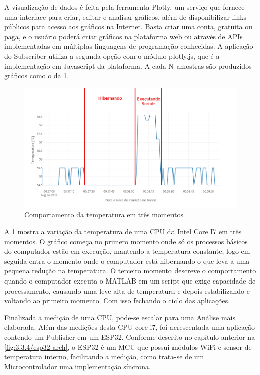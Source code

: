 A visualização de dados é feita pela ferramenta Plotly, um serviço que fornece uma interface para criar, editar e analisar gráficos, além de disponibilizar links públicos para acesso aos gráficos na Internet. Basta criar uma conta, gratuita ou paga, e o usuário poderá criar gráficos na plataforma web ou através de APIs implementadas em múltiplas linguagens de programação conhecidas. A aplicação do Subscriber utiliza a segunda opção com o módulo plotly.js, que é a implementação em Javascript da plataforma. A cada N amostras são produzidos gráficos como o da  \ref{fig:4.1.0/cpu-temp_1}.


\begin{figure}[h!]
\centering
\includegraphics[width=16cm]{./02_Capitulos/02_Cap4/figures/cpu-temp_1}
\caption{Comportamento da temperatura em três momentos}
\label{fig:4.1.0/cpu-temp_1}
\end{figure}

A \ref{fig:4.1.0/cpu-temp_1} mostra a variação da temperatura de uma CPU da Intel Core I7 em três momentos. O gráfico começa no primero momento onde só os processos básicos do computador estão em execução, mantendo a temperatura constante, logo em seguida entra o momento onde o computador está hibernando o que leva a uma pequena redução na temperatura. O terceiro momento descreve o comportamento quando o computador executa o MATLAB em um script que exige capacidade de processamento, causando uma leve alta de temperatura e depois estabilizando e voltando ao primeiro momento. Com isso fechando o ciclo das aplicações.


Finalizada a medição de uma CPU, pode-se escalar para uma Análise mais elaborada. Além das medições desta CPU core i7, foi acrescentada uma aplicação contendo um Publisher em um ESP32. Conforme descrito no capítulo anterior na \ref{fig:3.3.4/esp32-arch}, o ESP32 é um MCU que possui módulos WiFi e sensor de temperatura interno, facilitando a medição, como trata-se de um Microcontrolador uma implementação síncrona.


